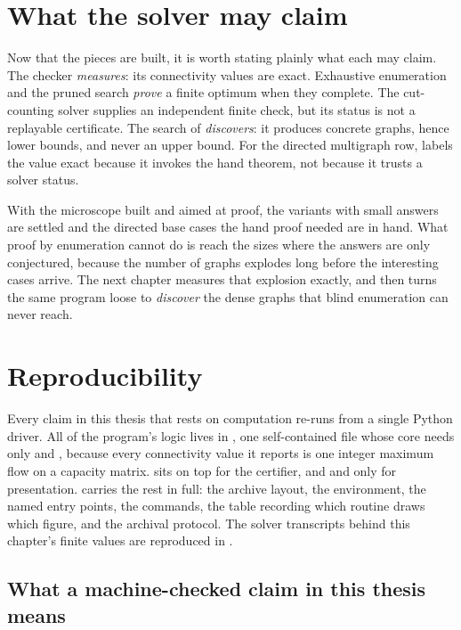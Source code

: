 \section{What the solver may claim}

Now that the pieces are built, it is worth stating plainly what each may claim. The checker \emph{measures}: its connectivity values are exact. Exhaustive enumeration and the pruned search \emph{prove} a finite optimum when they complete. The cut-counting solver supplies an independent finite check, but its status is not a replayable certificate. The search of  \emph{discovers}: it produces concrete graphs, hence lower bounds, and never an upper bound. For the directed multigraph row,  labels the value exact because it invokes the hand theorem, not because it trusts a solver status.

With the microscope built and aimed at proof, the variants with small answers are settled and the directed base cases the hand proof needed are in hand. What proof by enumeration cannot do is reach the sizes where the answers are only conjectured, because the number of graphs explodes long before the interesting cases arrive. The next chapter measures that explosion exactly, and then turns the same program loose to \emph{discover} the dense graphs that blind enumeration can never reach.

\section{Reproducibility}

Every claim in this thesis that rests on computation re-runs from a single Python driver. All of the program's logic lives in , one self-contained file whose core needs only  and , because every connectivity value it reports is one  integer maximum flow on a capacity matrix.  sits on top for the certifier, and  and  only for presentation.  carries the rest in full: the archive layout, the environment, the named entry points, the commands, the table recording which routine draws which figure, and the archival protocol. The solver transcripts behind this chapter's finite values are reproduced in .

\subsection{What a machine-checked claim in this thesis means}\label{sec:certification-standard}


